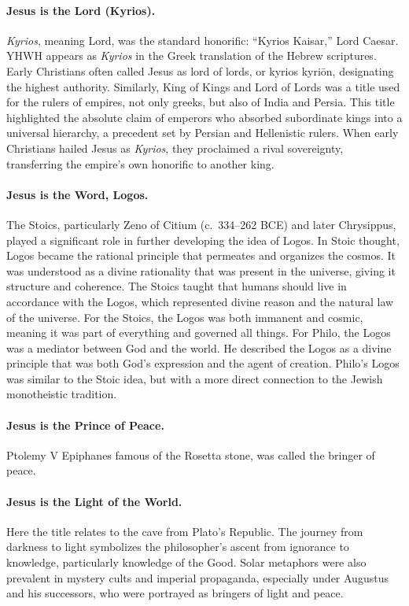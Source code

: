 \paragraph{Jesus is the Lord (Kyrios).}\label{par:jesus-is-the-lord-kyrios}
\emph{Kyrios}, meaning Lord, was the standard honorific: “Kyrios Kaisar,” Lord Caesar.
YHWH appears as \emph{Kyrios} in the Greek translation of the Hebrew scriptures.
Early Christians often called Jesus as lord of lords, or kyrios kyriōn, designating the highest authority.
Similarly, King of Kings and Lord of Lords was a title used for the rulers of empires, not only greeks, but also of India and Persia.
This title highlighted the absolute claim of emperors who absorbed subordinate kings into a universal hierarchy, a precedent set by Persian and Hellenistic rulers.
When early Christians hailed Jesus as \emph{Kyrios}, they proclaimed a rival sovereignty, transferring the empire’s own honorific to another king.

\paragraph{Jesus is the Word, Logos.}\label{par:jesus-is-the-word.}
The Stoics, particularly Zeno of Citium (c.~334–262 BCE) and later Chrysippus, played a significant role in further developing the idea of Logos.
In Stoic thought, Logos became the rational principle that permeates and organizes the cosmos.
It was understood as a divine rationality that was present in the universe, giving it structure and coherence.
The Stoics taught that humans should live in accordance with the Logos, which represented divine reason and the natural law of the universe.
For the Stoics, the Logos was both immanent and cosmic, meaning it was part of everything and governed all things.
For Philo, the Logos was a mediator between God and the world.
He described the Logos as a divine principle that was both God’s expression and the agent of creation.
Philo’s Logos was similar to the Stoic idea, but with a more direct connection to the Jewish monotheistic tradition.

\paragraph{Jesus is the Prince of Peace.}\label{par:jesus-is-the-prince-of-peace.}
Ptolemy V Epiphanes famous of the Rosetta stone, was called the bringer of peace.

\paragraph{Jesus is the Light of the World.}\label{par:jesus-is-the-light-of-the-world.}
Here the title relates to the cave from Plato’s Republic.
The journey from darkness to light symbolizes the philosopher’s ascent from ignorance to knowledge, particularly knowledge of the Good. Solar metaphors were also prevalent in mystery cults and imperial propaganda, especially under Augustus and his successors, who were portrayed as bringers of light and peace.

